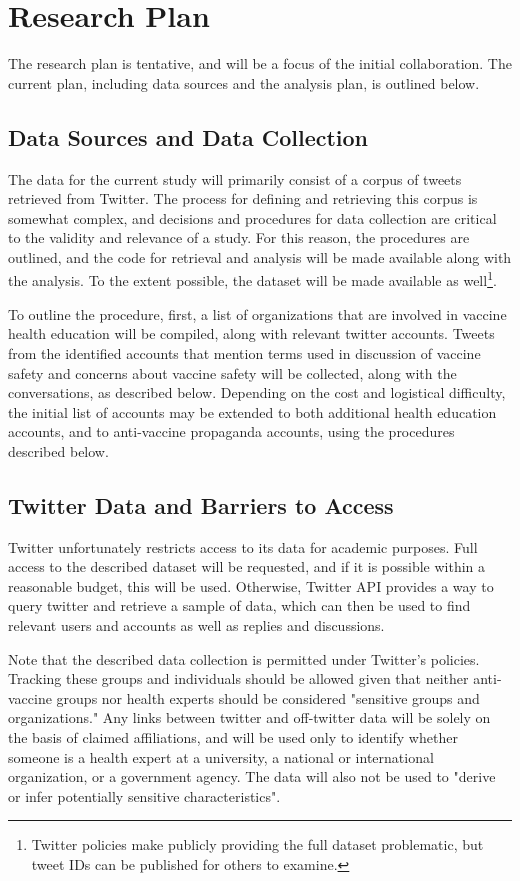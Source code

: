 \documentclass{article}
\begin{document}
\section{Research Plan}

The research plan is tentative, and will be a focus of the initial collaboration. The current plan, including data sources and the analysis plan, is outlined below.

\subsection{Data Sources and Data Collection}
The data for the current study will primarily consist of a corpus of tweets retrieved from Twitter. The process for defining and retrieving this corpus is somewhat complex, and decisions and procedures for data collection are critical to the validity and relevance of a study. For this reason, the procedures are outlined, and the code for retrieval and analysis will be made available along with the analysis. To the extent possible, the dataset will be made available as well\footnote{Twitter policies make publicly providing the full dataset problematic, but tweet IDs can be published for others to examine.}.

To outline the procedure, first, a list of organizations that are involved in vaccine health education will be compiled, along with relevant twitter accounts.  Tweets from the identified accounts that mention terms used in discussion of vaccine safety and concerns about vaccine safety will be collected, along with the conversations, as described below. Depending on the cost and logistical difficulty, the initial list of accounts may be extended to both additional health education accounts, and to anti-vaccine propaganda accounts, using the procedures described below.

\subsection{Twitter Data and Barriers to Access}
Twitter unfortunately restricts access to its data for academic purposes. \cite{Alaimo2018} Full access to the described dataset will be requested, and if it is possible within a reasonable budget, this will be used. Otherwise, Twitter API provides a way to query twitter and retrieve a sample of data, which can then be used to find relevant users and accounts as well as replies and discussions. 

Note that the described data collection is permitted under Twitter's policies. Tracking these groups and individuals should be allowed given that neither anti-vaccine groups nor health experts should be considered "sensitive groups and organizations." Any links between twitter and off-twitter data will be solely on the basis of claimed affiliations, and will be used only to identify whether someone is a health expert at a university, a national or international organization, or a government agency. The data will also not be used to "derive or infer potentially sensitive characteristics".
\end{document}

